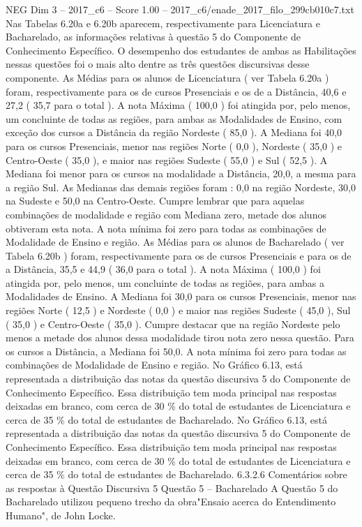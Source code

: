 \begin{textsample}{NEG Dim 3 – 2017\_c6 – Score 1.00 – 2017\_c6/enade\_2017\_filo\_299cb010c7.txt}
Nas Tabelas 6.20a e 6.20b aparecem, respectivamente para Licenciatura e Bacharelado, as informações relativas à questão 5 do Componente de Conhecimento Específico.
O desempenho dos estudantes de ambas as Habilitações nessas questões foi o mais alto dentre as três questões discursivas desse componente.
As Médias para os alunos de Licenciatura ( ver Tabela 6.20a ) foram, respectivamente para os de cursos Presenciais e os de a Distância, 40,6 e 27,2 ( 35,7 para o total ).
A nota Máxima ( 100,0 ) foi atingida por, pelo menos, um concluinte de todas as regiões, para ambas as Modalidades de Ensino, com exceção dos cursos a Distância da região Nordeste ( 85,0 ).
A Mediana foi 40,0 para os cursos Presenciais, menor nas regiões Norte ( 0,0 ), Nordeste ( 35,0 ) e Centro-Oeste ( 35,0 ), e maior nas regiões Sudeste ( 55,0 ) e Sul ( 52,5 ).
A Mediana foi menor para os cursos na modalidade a Distância, 20,0, a mesma para a região Sul.
As Medianas das demais regiões foram : 0,0 na região Nordeste, 30,0 na Sudeste e 50,0 na Centro-Oeste.
Cumpre lembrar que para aquelas combinações de modalidade e região com Mediana zero, metade dos alunos obtiveram esta nota.
A nota mínima foi zero para todas as combinações de Modalidade de Ensino e região.
As Médias para os alunos de Bacharelado ( ver Tabela 6.20b ) foram, respectivamente para os de cursos Presenciais e para os de a Distância, 35,5 e 44,9 ( 36,0 para o total ).
A nota Máxima ( 100,0 ) foi atingida por, pelo menos, um concluinte de todas as regiões, para ambas a Modalidades de Ensino.
A Mediana foi 30,0 para os cursos Presenciais, menor nas regiões Norte ( 12,5 ) e Nordeste ( 0,0 ) e maior nas regiões Sudeste ( 45,0 ), Sul ( 35,0 ) e Centro-Oeste ( 35,0 ).
Cumpre destacar que na região Nordeste pelo menos a metade dos alunos dessa modalidade tirou nota zero nessa questão.
Para os cursos a Distância, a Mediana foi 50,0.
A nota mínima foi zero para todas as combinações de Modalidade de Ensino e região.
No Gráfico 6.13, está representada a distribuição das notas da questão discursiva 5 do Componente de Conhecimento Específico.
Essa distribuição tem moda principal nas respostas deixadas em branco, com cerca de 30 \% do total de estudantes de Licenciatura e cerca de 35 \% do total de estudantes de Bacharelado.
No Gráfico 6.13, está representada a distribuição das notas da questão discursiva 5 do Componente de Conhecimento Específico.
Essa distribuição tem moda principal nas respostas deixadas em branco, com cerca de 30 \% do total de estudantes de Licenciatura e cerca de 35 \% do total de estudantes de Bacharelado. 6.3.2.6 Comentários sobre as respostas à Questão Discursiva 5 Questão 5 – Bacharelado A Questão 5 do Bacharelado utilizou pequeno trecho da obra"Ensaio acerca do Entendimento Humano", de John Locke.

\end{textsample}
